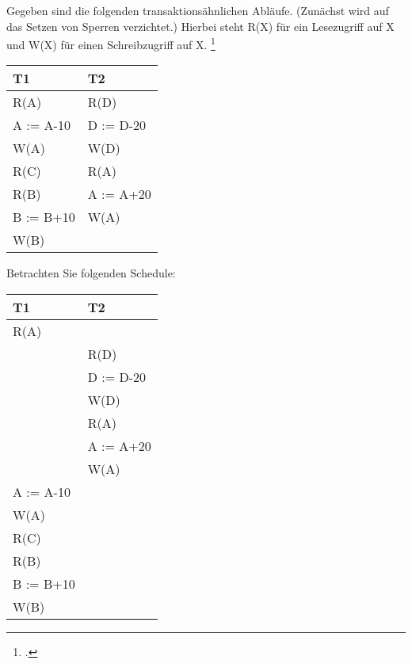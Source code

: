 \documentclass{bschlangaul-aufgabe}
\begin{document}

Gegeben sind die folgenden transaktionsähnlichen Abläufe. (Zunächst wird
auf das Setzen von Sperren verzichtet.) Hierbei steht R(X) für ein
Lesezugriff auf X und W(X) für einen Schreibzugriff auf X.
\footcite{examen:66116:2021:03}

\begin{center}
\begin{tabular}{|l|l|}
\hline
T1        & T2 \\\hline
R(A)      & R(D) \\
A := A-10 & D := D-20 \\
W(A)      & W(D) \\
R(C)      & R(A) \\
R(B)      & A := A+20 \\
B := B+10 & W(A) \\
W(B)      &
\\\hline
\end{tabular}
\end{center}

\noindent
Betrachten Sie folgenden Schedule:

\begin{center}
\begin{tabular}{|l|l|}
\hline
T1        & T2 \\\hline
R(A)      & \\
          & R(D) \\
          & D := D-20 \\
          & W(D) \\
          & R(A) \\
          & A := A+20 \\
          & W(A) \\
A := A-10 & \\
W(A)      & \\
R(C)      & \\
R(B)      & \\
B := B+10 & \\
W(B)      & \\\hline
\end{tabular}
\end{center}
\end{document}
